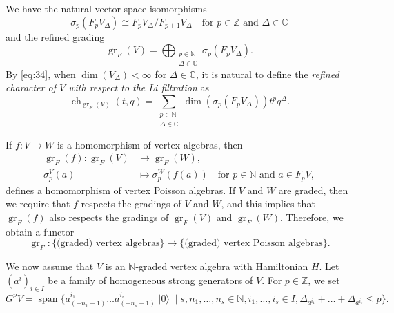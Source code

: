 \documentclass[a4paper, 12pt, reqno]{amsart}
\theoremstyle{remark}
\numberwithin{equation}{subsection}
\DeclareMathOperator{\gr}{gr}
\DeclareMathOperator{\ch}{ch}
\DeclareMathOperator{\vspan}{span}
\DeclareMathOperator{\vac}{|0\rangle}
\begin{document}
We have the natural vector space isomorphisms
\begin{equation*}
  \sigma_p(F_pV_{\Delta}) \cong F_pV_{\Delta}/F_{p + 1}V_{\Delta} \quad \text{for }p \in \mathbb{Z}\text{ and }\Delta \in \mathbb{C}
\end{equation*}
and the refined grading
\begin{equation}
  \label{eq:34}
  \gr_F(V) = \bigoplus_{\substack{p \in \mathbb{N} \\ \Delta \in \mathbb{C}}}\sigma_p(F_pV_{\Delta}).
\end{equation}
By \eqref{eq:34}, when $\dim(V_{\Delta}) < \infty$ for $\Delta \in \mathbb{C}$, it is natural to define the \emph{refined character of $V$ with respect to the Li filtration} as
\begin{equation*}
  \ch_{\gr_F(V)}(t, q) = \sum_{\substack{p \in \mathbb{N} \\ \Delta \in \mathbb{C}}}\dim(\sigma_p(F_pV_{\Delta}))t^pq^{\Delta}.
\end{equation*}

If $f: V \to W$ is a homomorphism of vertex algebras, then
\begin{align*}
  \gr_F(f): \gr_F(V) &\to \gr_F(W), \\
  \sigma^V_p(a) &\mapsto \sigma^W_p(f(a)) \quad \text{for }p \in \mathbb{N}\text{ and }a \in F_pV,
\end{align*}
defines a homomorphism of vertex Poisson algebras.
If $V$ and $W$ are graded, then we require that $f$ respects the gradings of $V$ and $W$, and this implies that $\gr_F(f)$ also respects the gradings of $\gr_F(V)$ and $\gr_F(W)$.
Therefore, we obtain a functor
\begin{equation*}
  \gr_F: \{\text{(graded) vertex algebras}\} \to \{\text{(graded) vertex Poisson algebras}\}.
\end{equation*}

We now assume that $V$ is an $\mathbb{N}$-graded vertex algebra with Hamiltonian $H$.
Let $(a^i)_{i \in I}$ be a family of homogeneous strong generators of $V$.
For $p \in \mathbb{Z}$, we set
\begin{equation*}
  G^pV = \vspan\{a^{i_1}_{(-n_1 - 1)}\dots a^{i_s}_{(-n_s - 1)}\vac \mid s, n_1, \dots, n_s \in \mathbb{N}, i_1, \dots, i_s \in I, \Delta_{a^{i_1}} + \dots + \Delta_{a^{i_s}} \le p\}.
\end{equation*}
\end{document}

